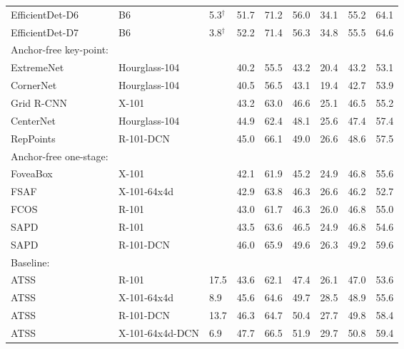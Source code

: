 \begin{table*}[tpb]
\begin{center}
\begin{tabular}{ K{11.0em} | K{8.0em} |K{2.5em} | K{4.2em} K{4.2em} K{4.2em} | K{4.2em} K{4.2em} K{4.2em} }
            EfficientDet-D6~\cite{EfficientDet} & B6 & 5.3$^{\dag}$ & 51.7 & 71.2 & 56.0 & 34.1 & 55.2 & 64.1  \\
            EfficientDet-D7~\cite{EfficientDet} & B6 & 3.8$^{\dag}$ & 52.2 & 71.4 & 56.3 & 34.8 & 55.5 & 64.6  \\
             
             \hline
             Anchor-free key-point: &    &  &  &  &  &\\ 
             ExtremeNet~\cite{extremeNet} & Hourglass-104 &  & 40.2 & 55.5 & 43.2 & 20.4 & 43.2 & 53.1  \\
             CornerNet~\cite{cornerNet} & Hourglass-104 &  & 40.5 & 56.5 & 43.1 & 19.4 & 42.7 & 53.9  \\
             Grid R-CNN~\cite{gridRCNN} & X-101 &  & 43.2 & 63.0 & 46.6 & 25.1 & 46.5 & 55.2  \\
             CenterNet~\cite{cornerNet} & Hourglass-104 &  & 44.9 & 62.4 & 48.1 & 25.6 & 47.4 & 57.4  \\
             RepPoints~\cite{repPoints} & R-101-DCN &  & 45.0 & 66.1 & 49.0 & 26.6 & 48.6 & 57.5  \\
             
             \hline
             Anchor-free one-stage: &    &  &  &  &  &\\
             FoveaBox~\cite{foveaBox} & X-101 &  & 42.1 & 61.9 & 45.2 & 24.9 & 46.8 & 55.6  \\
             FSAF~\cite{FSAF} & X-101-64x4d &  & 42.9 & 63.8 & 46.3 & 26.6 & 46.2 & 52.7  \\
             FCOS~\cite{FCOS} & R-101 &   & 43.0 & 61.7 & 46.3 & 26.0 & 46.8 & 55.0  \\
             SAPD~\cite{SAPD} & R-101 &   & 43.5 & 63.6 & 46.5 & 24.9 & 46.8 & 54.6  \\
             SAPD~\cite{SAPD} & R-101-DCN &  & 46.0 & 65.9 & 49.6 & 26.3 & 49.2 & 59.6  \\
             


             
             
             
             \hline
             Baseline: &    &  &  &  &  &\\
             ATSS~\cite{ATSS} & R-101 & 17.5 & 43.6 & 62.1 & 47.4 & 26.1 & 47.0 & 53.6 \\
             ATSS~\cite{ATSS} & X-101-64x4d & 8.9 & 45.6 & 64.6 & 49.7 & 28.5 & 48.9 & 55.6 \\
             ATSS~\cite{ATSS} & R-101-DCN & 13.7 & 46.3 & 64.7 & 50.4 & 27.7 & 49.8 & 58.4 \\
             ATSS~\cite{ATSS} & X-101-64x4d-DCN & 6.9 & 47.7 & 66.5 & 51.9 & 29.7 & 50.8 & 59.4 \\
            

\end{tabular}
\end{center}
\end{table*}
